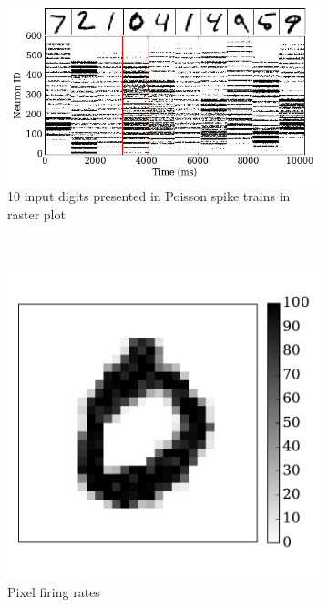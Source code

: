 		\begin{figure}[tbh!]
		\centering
		\begin{subfigure}[t]{0.8\textwidth}
			\includegraphics[width=\textwidth]{pics_iconip/6-1.png}
			\caption{10 input digits presented in Poisson spike trains in raster plot}
			\label{Fig:61}
		\end{subfigure}\\
		\begin{subfigure}[t]{0.3\textwidth}
			\includegraphics[width=\textwidth]{pics_iconip/6-2.pdf}
			\caption{Pixel firing rates}
			\label{Fig:62}
		\end{subfigure}
		\begin{subfigure}[t]{0.3\textwidth}

\end{subfigure}
\end{figure}
